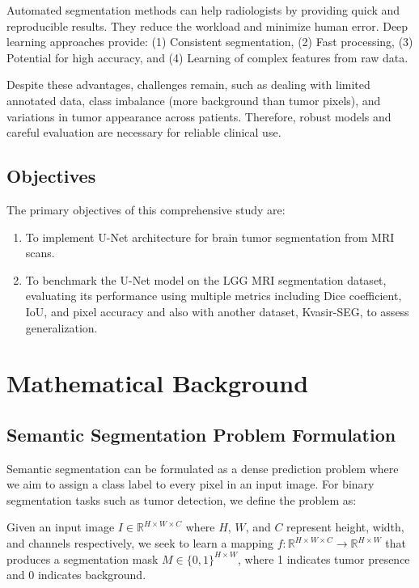 \documentclass[a4paper, journal]{IEEEtran}
\begin{document}
Automated segmentation methods can help radiologists by providing quick and reproducible results. They reduce the workload and minimize human error. Deep learning approaches provide: (1) Consistent segmentation, (2) Fast processing, (3) Potential for high accuracy, and (4) Learning of complex features from raw data.

Despite these advantages, challenges remain, such as dealing with limited annotated data, class imbalance (more background than tumor pixels), and variations in tumor appearance across patients. Therefore, robust models and careful evaluation are necessary for reliable clinical use.

\subsection{Objectives}
The primary objectives of this comprehensive study are:

\begin{enumerate}
    \item To implement U-Net architecture for brain tumor segmentation from MRI scans.
    \item To benchmark the U-Net model on the LGG MRI segmentation dataset, evaluating its performance using multiple metrics including Dice coefficient, IoU, and pixel accuracy and also with another dataset, Kvasir-SEG, to assess generalization.
\end{enumerate}



\section{Mathematical Background}

\subsection{Semantic Segmentation Problem Formulation}
Semantic segmentation can be formulated as a dense prediction problem where we aim to assign a class label to every pixel in an input image. For binary segmentation tasks such as tumor detection, we define the problem as:

Given an input image $I \in \mathbb{R}^{H \times W \times C}$ where $H$, $W$, and $C$ represent height, width, and channels respectively, we seek to learn a mapping $f: \mathbb{R}^{H \times W \times C} \rightarrow \mathbb{R}^{H \times W}$ that produces a segmentation mask $M \in \{0,1\}^{H \times W}$, where 1 indicates tumor presence and 0 indicates background.
\end{document}
